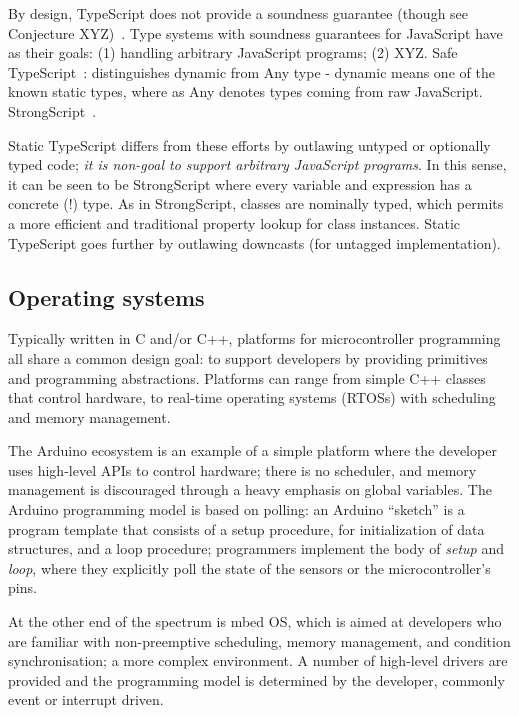 By design, TypeScript does not provide a soundness guarantee (though see Conjecture XYZ)~\cite{BiermanAT14}.
Type systems with soundness guarantees for JavaScript have as their
goals: (1) handling arbitrary JavaScript programs; (2) XYZ.
Safe TypeScript~\cite{SafeTypeScript15}: distinguishes dynamic from Any type - dynamic means
one of the known static types, where as Any denotes types coming
from raw JavaScript.
StrongScript~\cite{StrongScriptECOOP15}.

Static TypeScript differs from these efforts by outlawing untyped or optionally typed
code; \emph{it is non-goal to support arbitrary JavaScript programs}.
In this sense, it can be seen to be StrongScript where every variable and 
expression has a concrete (!) type.   As in StrongScript, classes are nominally typed,
which permits a more efficient and traditional property lookup for class instances. 
Static TypeScript goes further by outlawing downcasts (for untagged implementation).

\subsection{Operating systems}

Typically written in C and/or C++, platforms for microcontroller programming all share 
a common design goal: to support developers by providing primitives and programming 
abstractions. Platforms can range from simple C++ classes that control hardware, 
to real-time operating systems (RTOSs) with scheduling and memory management.

The Arduino ecosystem is an example of a simple platform where the developer uses 
high-level APIs to control hardware; there is no scheduler, and memory management 
is discouraged through a heavy emphasis on global variables.  The Arduino programming 
model is based on polling: an Arduino ``sketch'' is a program template that consists 
of a setup procedure, for initialization of data structures, and a loop procedure; 
programmers implement the body of \textit{setup} and \textit{loop}, where they explicitly 
poll the state of the sensors or the microcontroller's pins.

At the other end of the spectrum is mbed OS, which is aimed at developers who are familiar 
with non-preemptive scheduling, memory management, and condition synchronisation; a more 
complex environment. A number of high-level drivers are provided and the programming model 
is determined by the developer, commonly event or interrupt driven.

